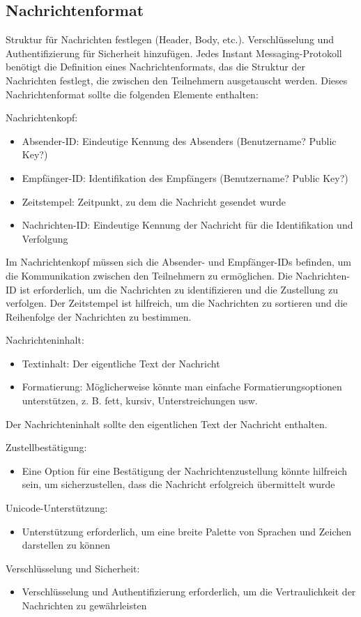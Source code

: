 \subsection{Nachrichtenformat}

Struktur für Nachrichten festlegen (Header, Body, etc.).
Verschlüsselung und Authentifizierung für Sicherheit hinzufügen.
Jedes Instant Messaging-Protokoll benötigt die Definition eines Nachrichtenformats,
das die Struktur der Nachrichten festlegt, die zwischen den Teilnehmern ausgetauscht werden.
Dieses Nachrichtenformat sollte die folgenden Elemente enthalten:

\noindent Nachrichtenkopf:
\begin{itemize}
    \item Absender-ID: Eindeutige Kennung des Absenders (Benutzername? Public Key?)
    \item Empfänger-ID: Identifikation des Empfängers (Benutzername? Public Key?)
    \item Zeitstempel: Zeitpunkt, zu dem die Nachricht gesendet wurde
    \item Nachrichten-ID: Eindeutige Kennung der Nachricht für die Identifikation 
    und Verfolgung
\end{itemize}

Im Nachrichtenkopf müssen sich die Absender- und Empfänger-IDs befinden,
um die Kommunikation zwischen den Teilnehmern zu ermöglichen.
Die Nachrichten-ID ist erforderlich, um die Nachrichten zu identifizieren und
die Zustellung zu verfolgen. Der Zeitstempel ist hilfreich, um die Nachrichten
zu sortieren und die Reihenfolge der Nachrichten zu bestimmen.


\noindent Nachrichteninhalt:
\begin{itemize}
    \item Textinhalt: Der eigentliche Text der Nachricht
    \item Formatierung: Möglicherweise könnte man einfache Formatierungsoptionen 
    unterstützen, z. B. fett, kursiv, Unterstreichungen usw.
\end{itemize}

Der Nachrichteninhalt sollte den eigentlichen Text der Nachricht enthalten.


\noindent Zustellbestätigung:
\begin{itemize}
    \item Eine Option für eine Bestätigung der Nachrichtenzustellung könnte 
    hilfreich sein, um sicherzustellen, dass die Nachricht erfolgreich 
    übermittelt wurde
\end{itemize}


\noindent Unicode-Unterstützung:
\begin{itemize}
    \item Unterstützung erforderlich, um eine breite Palette von Sprachen und
    Zeichen darstellen zu können
\end{itemize}

\noindent Verschlüsselung und Sicherheit:
\begin{itemize}
    \item Verschlüsselung und Authentifizierung erforderlich, um die Vertraulichkeit 
    der Nachrichten zu gewährleisten
\end{itemize}